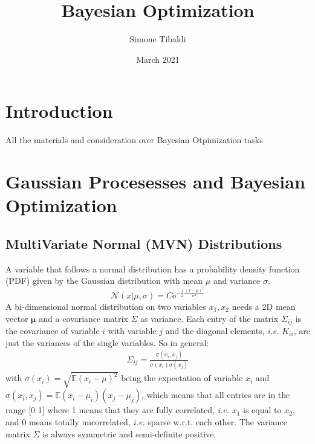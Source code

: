 \documentclass{article}
\title{Bayesian Optimization}
\author{Simone Tibaldi}
\date{March 2021}
\begin{document}
\maketitle

\section{Introduction}
All the materials and consideration over Bayesian Otpimization tasks

\section{Gaussian Procesesses and Bayesian Optimization}

\subsection{MultiVariate Normal (MVN) Distributions}
A variable that follows a normal distribution has a probability density function (PDF) given by the Gaussian distribution with mean $\mu$ and variance $\sigma$.
\begin{equation}
    \mathcal{N}(x | \mu, \sigma) = C \text{e}^{-\frac{1}{2} \frac{(x-\mu)^2}{\sigma^2}}
\end{equation}
A bi-dimensional normal distribution on two variables $x_1, x_2$ needs a 2D mean vector $\mathbf{\mu}$ and a covariance matrix $\Sigma$ as variance. Each entry of the matrix $\Sigma_{ij}$ is the covariance of variable $i$ with variable $j$ and the diagonal elements, \textit{i.e.} $K_{ii}$, are just the variances of the single variables. So in general: 
\begin{align*}
    \Sigma_{ij} = \frac{\sigma(x_i, x_j)}{\sigma(x_i)\sigma(x_j)} 
\end{align*}
with $\sigma(x_i) = \sqrt{\mathbb{E}(x_i - \mu)^2}$ being the expectation of variable $x_i$ and $\sigma(x_i, x_j) =  \mathbb{E}(x_i - \mu_i)(x_j - \mu_j)$, which means that all entries are in the range [0 1] where 1 means that they are fully correlated, \textit{i.e.} $x_1$ is equal to $x_2$, and 0 means totally uncorrelated, \textit{i.e.} sparse w.r.t. each other. The variance matrix $\Sigma$ is always symmetric and semi-definite positive.
\end{document}
